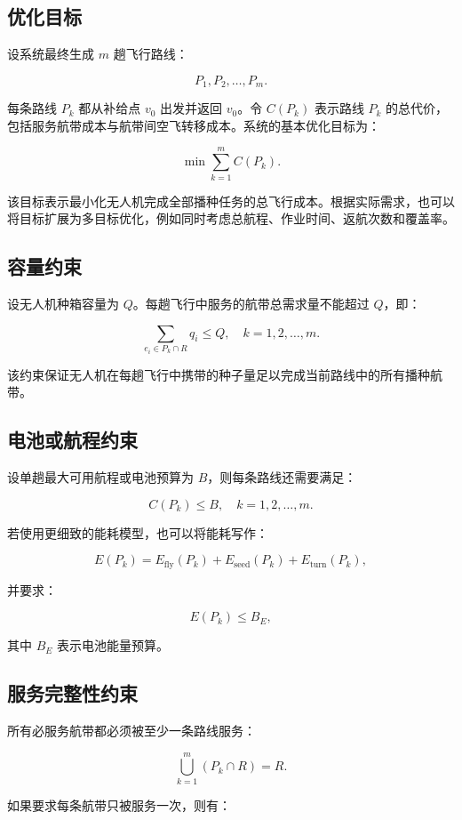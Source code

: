 \documentclass[UTF8,a4paper,12pt]{ctexart}
\begin{document}
\subsection{优化目标}

设系统最终生成 \(m\) 趟飞行路线：

\[
P_1,P_2,\dots,P_m.
\]

每条路线 \(P_k\) 都从补给点 \(v_0\) 出发并返回 \(v_0\)。令 \(C(P_k)\) 表示路线 \(P_k\) 的总代价，包括服务航带成本与航带间空飞转移成本。系统的基本优化目标为：

\[
\min \sum_{k=1}^{m} C(P_k).
\]

该目标表示最小化无人机完成全部播种任务的总飞行成本。根据实际需求，也可以将目标扩展为多目标优化，例如同时考虑总航程、作业时间、返航次数和覆盖率。

\subsection{容量约束}

设无人机种箱容量为 \(Q\)。每趟飞行中服务的航带总需求量不能超过 \(Q\)，即：

\[
\sum_{e_i \in P_k \cap R} q_i \leq Q,\quad k=1,2,\dots,m.
\]

该约束保证无人机在每趟飞行中携带的种子量足以完成当前路线中的所有播种航带。

\subsection{电池或航程约束}

设单趟最大可用航程或电池预算为 \(B\)，则每条路线还需要满足：

\[
C(P_k) \leq B,\quad k=1,2,\dots,m.
\]

若使用更细致的能耗模型，也可以将能耗写作：

\[
E(P_k)=E_{\text{fly}}(P_k)+E_{\text{seed}}(P_k)+E_{\text{turn}}(P_k),
\]

并要求：

\[
E(P_k) \leq B_E,
\]

其中 \(B_E\) 表示电池能量预算。

\subsection{服务完整性约束}

所有必服务航带都必须被至少一条路线服务：

\[
\bigcup_{k=1}^{m} (P_k \cap R) = R.
\]

如果要求每条航带只被服务一次，则有：
\end{document}

